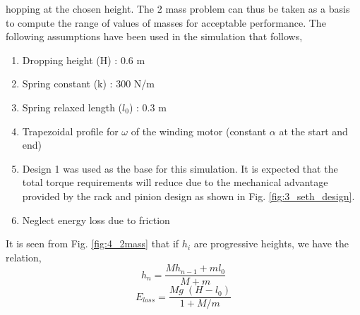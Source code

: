 hopping at the chosen height. The 2 mass problem can thus be taken as a basis to compute the range of values of masses
for acceptable performance. The following assumptions have been used in the simulation that follows,
\begin{enumerate}
\item
Dropping height (H) : 0.6 m
\item
Spring constant (k) : 300 N/m
\item
Spring relaxed length ($l_0$) : 0.3 m
\item
Trapezoidal profile for $\omega$ of the winding motor (constant $\alpha$ at the start and end)
\item
Design 1 was used as the base for this simulation. It is expected that the total torque requirements will
reduce due to the mechanical advantage provided by the rack and pinion design as shown in Fig. \ref{fig:3_seth_design}.
\item
Neglect energy loss due to friction
\end{enumerate}
It is seen from Fig. \ref{fig:4_2mass} that if $h_i$ are progressive heights, we have the relation,
\begin{equation}
h_n = \frac{Mh_{n-1} + ml_0}{M + m}
\end{equation}
\begin{equation}
\label{eqn:4_eloss}
E_{loss} = \frac{Mg\;(H-l_0)}{1 + M/m}
\end{equation}

